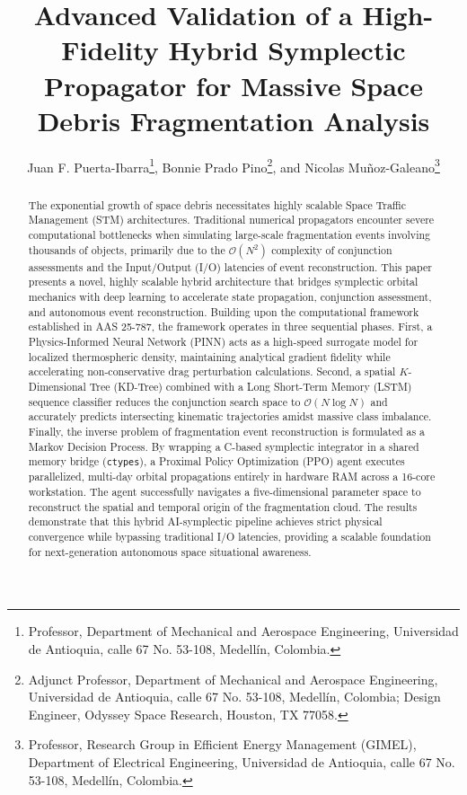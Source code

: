 \documentclass[letterpaper,11pt]{AAS}
\begin{document}
\title{Advanced Validation of a High-Fidelity Hybrid Symplectic Propagator for Massive Space Debris Fragmentation Analysis}

\author{
  Juan F. Puerta-Ibarra\footnote{Professor, Department of Mechanical and Aerospace Engineering, Universidad de Antioquia, calle 67 No. 53-108, Medellín, Colombia.}, 
  Bonnie Prado Pino\footnote{Adjunct Professor, Department of Mechanical and Aerospace Engineering, Universidad de Antioquia, calle 67 No. 53-108, Medellín, Colombia; Design Engineer, Odyssey Space Research, Houston, TX 77058.}, 
  and Nicolas Muñoz-Galeano\footnote{Professor, Research Group in Efficient Energy Management (GIMEL), Department of Electrical Engineering, Universidad de Antioquia, calle 67 No. 53-108, Medellín, Colombia.}
}

\maketitle

\begin{abstract}
The exponential growth of space debris necessitates highly scalable Space Traffic Management (STM) architectures. Traditional numerical propagators encounter severe computational bottlenecks when simulating large-scale fragmentation events involving thousands of objects, primarily due to the $\mathcal{O}(N^2)$ complexity of conjunction assessments and the Input/Output (I/O) latencies of event reconstruction. This paper presents a novel, highly scalable hybrid architecture that bridges symplectic orbital mechanics with deep learning to accelerate state propagation, conjunction assessment, and autonomous event reconstruction. Building upon the computational framework established in AAS 25-787, the framework operates in three sequential phases. First, a Physics-Informed Neural Network (PINN) acts as a high-speed surrogate model for localized thermospheric density, maintaining analytical gradient fidelity while accelerating non-conservative drag perturbation calculations. Second, a spatial $K$-Dimensional Tree (KD-Tree) combined with a Long Short-Term Memory (LSTM) sequence classifier reduces the conjunction search space to $\mathcal{O}(N \log N)$ and accurately predicts intersecting kinematic trajectories amidst massive class imbalance. Finally, the inverse problem of fragmentation event reconstruction is formulated as a Markov Decision Process. By wrapping a C-based symplectic integrator in a shared memory bridge (\texttt{ctypes}), a Proximal Policy Optimization (PPO) agent executes parallelized, multi-day orbital propagations entirely in hardware RAM across a 16-core workstation. The agent successfully navigates a five-dimensional parameter space to reconstruct the spatial and temporal origin of the fragmentation cloud. The results demonstrate that this hybrid AI-symplectic pipeline achieves strict physical convergence while bypassing traditional I/O latencies, providing a scalable foundation for next-generation autonomous space situational awareness.
\end{abstract}
\end{document}
